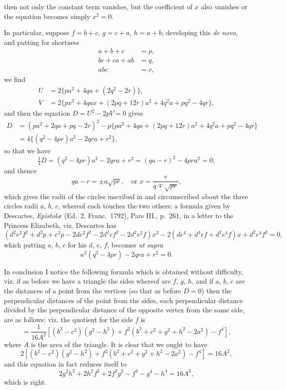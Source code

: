 \documentclass[11pt,a4paper]{book}
\begin{document}
\newpage
\setcounter{page}{512}

then not only the constant term vanishes, but the coefficient of $x$ also vanishes or the equation becomes simply $x^2 = 0$.

In particular, suppose $f=b+c$, $g=c+a$, $h=a+b$; developing this \textit{de novo}, and putting for shortness
\begin{align*}
a+b+c &= p,\\
bc+ca+ab &= q,\\
abc &= r,
\end{align*}
we find
\begin{align*}
U &= 2\{pa^2 + 4qa + (2q^2 - 2r)\},\\
V &= 2\{px^2 + 4qax + (2pq + 12r)a^2 + 4q^2a + pq^2 - 4qr\},
\end{align*}
and then the equation $D = U^2 - 2pV = 0$ gives
\begin{align*}
D &= (pa^2 + 2qa + pq - 2r)^2 - p\{pa^2 + 4qa + (2pq+12r)a^2 + 4q^2a + pq^2 - 4qr\}\\
&= 4\{(q^2 - 4pr)a^2 - 2qra + r^2\},
\end{align*}
so that we have
\[
\tfrac{1}{4}D = (q^2 - 4pr)a^2 - 2qra + r^2 = (qa-r)^2 - 4pra^2 = 0,
\]
and thence
\[
qa - r = \pm a\sqrt{pr},\quad \text{or } x = \frac{r}{q \mp \sqrt{pr}},
\]
which gives the radii of the circles inscribed in and circumscribed about the three circles radii $a$, $b$, $c$, whereof each touches the two others: a formula given by Descartes, \textit{Epistol\ae} (Ed.~2, Franc.~1792), Pars III., p.~261, in a letter to the Princess Elizabeth, viz. Descartes has
\[
(d^2e^2f^2 + d^2p + e^2p - 2de^2f^2 - 2d^2ef^2 - 2d^2e^2f)x^2 - 2(de^4 + d^4ef + d^2e^4f)x + d^2e^4f^2 = 0,
\]
which putting $a$, $b$, $c$ for his $d$, $e$, $f$, becomes \textit{ut supra}
\[
a^2(q^2 - 4pr) - 2qra + r^2 = 0.
\]

In conclusion I notice the following formula which is obtained without difficulty, viz. if as before we have a triangle the sides whereof are $f$, $g$, $h$, and if $a$, $b$, $c$ are the distances of a point from the vertices (so that as before $D = 0$) then the perpendicular distances of the point from the sides, each perpendicular distance divided by the perpendicular distance of the opposite vertex from the same side, are as follows: viz. the quotient for the side $f$ is
\[
= \frac{1}{16A^2}[(b^2-c^2)(g^2-h^2) + f^2(b^2+c^2+g^2+h^2-2a^2) - f^4],
\]
where $A$ is the area of the triangle. It is clear that we ought to have
\[
2[(b^2-c^2)(g^2-h^2) + f^2(b^2+c^2+g^2+h^2-2a^2) - f^4] = 16A^2,
\]
and this equation in fact reduces itself to
\[
2g^2h^2 + 2h^2f^2 + 2f^2g^2 - f^4 - g^4 - h^4 = 16A^2,
\]
which is right.
\end{document}
